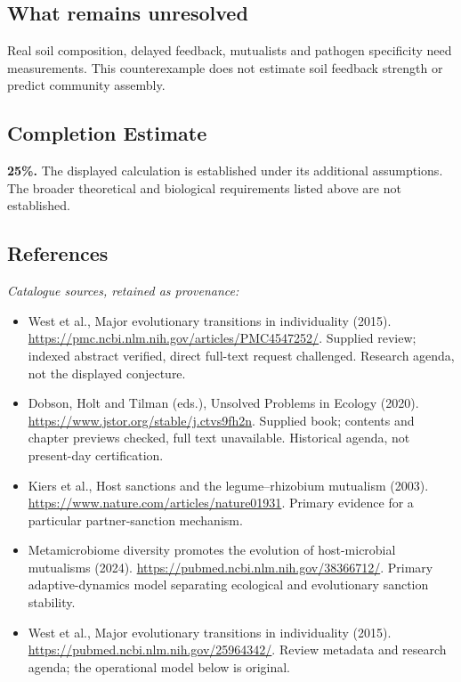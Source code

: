 \documentclass[11pt]{article}
\begin{document}
\subsection{What remains unresolved}
Real soil composition, delayed feedback, mutualists and pathogen specificity need measurements. This counterexample does not estimate soil feedback strength or predict community assembly.
\subsection{Completion Estimate}
\textbf{25\%.} The displayed calculation is established under its additional assumptions. The broader theoretical and biological requirements listed above are not established.
\subsection{References}
\noindent\emph{Catalogue sources, retained as provenance:}
\begin{itemize}
\item West et al., Major evolutionary transitions in individuality (2015). \url{https://pmc.ncbi.nlm.nih.gov/articles/PMC4547252/}. Supplied review; indexed abstract verified, direct full-text request challenged. Research agenda, not the displayed conjecture.
\item Dobson, Holt and Tilman (eds.), Unsolved Problems in Ecology (2020). \url{https://www.jstor.org/stable/j.ctvs9fh2n}. Supplied book; contents and chapter previews checked, full text unavailable. Historical agenda, not present-day certification.
\item Kiers et al., Host sanctions and the legume--rhizobium mutualism (2003). \url{https://www.nature.com/articles/nature01931}. Primary evidence for a particular partner-sanction mechanism.
\item Metamicrobiome diversity promotes the evolution of host-microbial mutualisms (2024). \url{https://pubmed.ncbi.nlm.nih.gov/38366712/}. Primary adaptive-dynamics model separating ecological and evolutionary sanction stability.
\item West et al., Major evolutionary transitions in individuality (2015). \url{https://pubmed.ncbi.nlm.nih.gov/25964342/}. Review metadata and research agenda; the operational model below is original.
\end{itemize}
\end{document}
